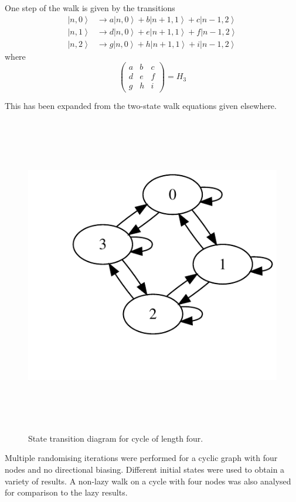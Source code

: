 \documentclass[a0,portrait]{a0poster}
\newcommand{\ket}[1]{\left| #1\right\rangle}
\begin{document}
\begin{center}
{One step of the walk is given by the transitions
\begin{eqnarray}
\ket{n,0} &\longrightarrow a\ket{n,0} + b\ket{n+1,1} + c\ket{n-1,2}\\
\ket{n,1} &\longrightarrow d\ket{n,0} + e\ket{n+1,1} + f\ket{n-1,2}\\
\ket{n,2} &\longrightarrow g\ket{n,0} + h\ket{n+1,1} + i\ket{n-1,2}
\end{eqnarray} 
where 
\begin{equation}
\begin{pmatrix}
  a & b & c \\
  d & e & f \\
  g & h & i 
\end{pmatrix} = H_3
\end{equation}

This has been expanded from the two-state walk equations given elsewhere\cite{Ke:2003,Mc:2010}.

\begin{figure}
\includegraphics[height=140mm]{std-1.pdf}
\caption{State transition diagram for cycle of length four.}
\label{std_10k}
\end{figure}    

Multiple randomising iterations were performed for a cyclic graph with four nodes and no directional biasing. Different initial states were used to obtain a variety of results. A non-lazy walk on a cycle with four nodes was also analysed for comparison to the lazy results.
}
\col{
}
\end{center}
\end{document}
